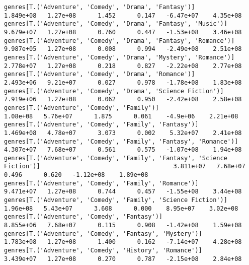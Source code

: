 \documentclass[11pt]{article}
\begin{document}
\begin{Verbatim}[commandchars=\\\{\}]
genres[T.('Adventure', 'Comedy', 'Drama', 'Fantasy')]                                                         1.849e+08   1.27e+08      1.452      0.147   -6.47e+07    4.35e+08
genres[T.('Adventure', 'Comedy', 'Drama', 'Fantasy', 'Music')]                                                9.679e+07   1.27e+08      0.760      0.447   -1.53e+08    3.46e+08
genres[T.('Adventure', 'Comedy', 'Drama', 'Fantasy', 'Romance')]                                              9.987e+05   1.27e+08      0.008      0.994   -2.49e+08    2.51e+08
genres[T.('Adventure', 'Comedy', 'Drama', 'Mystery', 'Romance')]                                              2.778e+07   1.27e+08      0.218      0.827   -2.22e+08    2.77e+08
genres[T.('Adventure', 'Comedy', 'Drama', 'Romance')]                                                         2.493e+06   9.21e+07      0.027      0.978   -1.78e+08    1.83e+08
genres[T.('Adventure', 'Comedy', 'Drama', 'Science Fiction')]                                                 7.919e+06   1.27e+08      0.062      0.950   -2.42e+08    2.58e+08
genres[T.('Adventure', 'Comedy', 'Family')]                                                                    1.08e+08   5.76e+07      1.875      0.061    -4.9e+06    2.21e+08
genres[T.('Adventure', 'Comedy', 'Family', 'Fantasy')]                                                        1.469e+08   4.78e+07      3.073      0.002    5.32e+07    2.41e+08
genres[T.('Adventure', 'Comedy', 'Family', 'Fantasy', 'Romance')]                                             4.307e+07   7.68e+07      0.561      0.575   -1.07e+08    1.94e+08
genres[T.('Adventure', 'Comedy', 'Family', 'Fantasy', 'Science Fiction')]                                     3.811e+07   7.68e+07      0.496      0.620   -1.12e+08    1.89e+08
genres[T.('Adventure', 'Comedy', 'Family', 'Romance')]                                                        9.471e+07   1.27e+08      0.744      0.457   -1.55e+08    3.44e+08
genres[T.('Adventure', 'Comedy', 'Family', 'Science Fiction')]                                                 1.96e+08   5.43e+07      3.608      0.000    8.95e+07    3.02e+08
genres[T.('Adventure', 'Comedy', 'Fantasy')]                                                                  8.855e+06   7.68e+07      0.115      0.908   -1.42e+08    1.59e+08
genres[T.('Adventure', 'Comedy', 'Fantasy', 'Mystery')]                                                       1.783e+08   1.27e+08      1.400      0.162   -7.14e+07    4.28e+08
genres[T.('Adventure', 'Comedy', 'History', 'Romance')]                                                       3.439e+07   1.27e+08      0.270      0.787   -2.15e+08    2.84e+08

\end{Verbatim}
\end{document}
